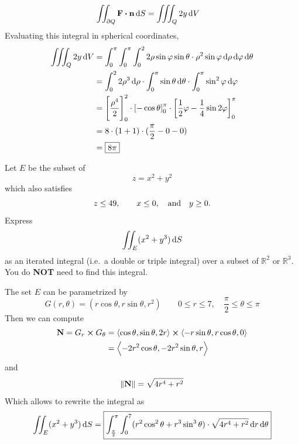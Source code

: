 \documentclass[12pt,answers]{exam}
\newcommand{\vect}[1]{\left\langle #1 \right\rangle}
\newcommand{\RR}{\mathbb{R}}
\begin{document}
\begin{questions}
\begin{solution}
    \begin{align*}
      \iint_{\partial Q} \vb F \vdot \vb{n} \dif S
      &= \iiint_Q 2y \dif V
    \end{align*}
    Evaluating this integral in spherical coordinates,
    \begin{align*}
      \iiint_{Q} 2y \dif V 
      &= \int_{0}^{\pi} \int_0^\pi \int_0^2 2 \rho \sin\varphi \sin\theta \cdot \rho^2 \sin\varphi \dif \rho \dif \varphi \dif \theta\\
      &= \int_0^2 2\rho^3 \dif \rho 
      \cdot
      \int_{0}^{\pi} \sin\theta \dif \theta
      \cdot
      \int_0^\pi \sin^2\varphi \dif \varphi 
      \\
      &= \left[ \frac{\rho^4}{2} \right]_0^2
      \cdot
      \left[-\cos\theta\right]_0^\pi
      \cdot
      \left[\frac12 \varphi - \frac14 \sin2\varphi\right]_0^\pi
      \\
      &= 8 \cdot (1+1) \cdot (\frac\pi2 - 0 - 0) 
      \\
      &= \boxed{8\pi}
    \end{align*}
  \end{solution}
  
  \newpage
  \question
  Let $E$ be the subset of
  \[
  z = x^2 + y^2
  \]
  which also satisfies 
  \[
  z \le 49, \qquad x \le 0, \qand y \ge 0.
  \]
  Express
  \[
  \iint_E (x^2 + y^3) \dif S
  \]
  as an iterated integral (i.e.~a double or triple integral) over a subset of $\RR^2$ or $\RR^3$. You do \textbf{NOT} need to find this integral.
  \begin{solution}
    The set $E$ can be parametrized by 
    \[
    G(r, \theta) = (r \cos \theta, r\sin\theta, r^2) 
    \qquad 0 \le r \le 7, 
    \quad \frac\pi2\le \theta \le \pi
    \]
    Then we can compute
    \begin{align*}
      \vb{N} = G_r \cross G_\theta 
      &= \vect{\cos \theta, \sin\theta, 2r} \cross \vect{-r\sin\theta, r\cos\theta, 0}  \\ 
      &= \vect{-2r^2\cos\theta, -2r^2\sin\theta, r}
    \end{align*}
    and
    \[
    \|\vb{N}\| = \sqrt{4r^4+r^2}
    \]
    Which allows to rewrite the integral as
    \[
    \iint_E (x^2+y^3) \dif S 
    = \boxed{\int_{\frac\pi2}^\pi \int_0^7 (r^2 \cos^2\theta + r^3\sin^3\theta) \cdot \sqrt{4r^4+r^2} \dif r \dif \theta}
    \]
    
  \end{solution}
  

\end{questions}
\end{document}
